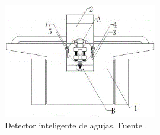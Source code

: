 \begin{figure}[H]
	\centering
	\includegraphics[width=0.6\textwidth]{img/221009135809.png}
	\caption[Detector inteligente de agujas.]{Detector inteligente de agujas. Fuente \cite{CN218147467U}.}
	\label{fig:221009135809}
\end{figure}